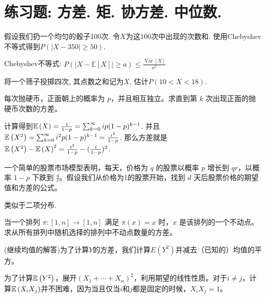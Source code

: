 \section*{练习题: 方差. 矩. 协方差. 中位数.}
\begin{exercise}[投掷筛子]
    假设我们扔一个均匀的骰子100次. 令$X$为这100次中出现的次数和. 使用Chebyshev不等式得到$P(|X-350| \geq 50)$.
\end{exercise}
\begin{solution*}
    Chebyshev不等式: $P(|X-\mathbb{E}[X]| \geq a) \leq \frac{\operatorname{Var}[X]}{a^2}$
\end{solution*}

\begin{exercise}
    将一个筛子投掷四次, 其点数之和记为$X$, 估计$P(10<X<18)$.
\end{exercise}

\begin{exercise}
    每次抛硬币，正面朝上的概率为 \(p\)，并且相互独立。求直到第 \(k\) 次出现正面的抛硬币次数的方差。 
\end{exercise}

\begin{solution*}
    计算得到$\mathbb E\left(X\right)=\frac{i}{1-p}=\sum_{k=0}^{\infty} i p (1 - p)^{k - 1}$. 并且$\mathbb E\left(X^2\right)=\sum_{k=0}^{\infty} i^2 p (1 - p)^{k - 1}=\frac{i^2}{1-p}$. 那么方差就是$\mathbb E\left(X^2\right)-\mathbb E\left(X\right)^2=\frac{i^2}{1-p}-(\frac{i}{1-p})^2$.
\end{solution*}

\begin{exercise}
一个简单的股票市场模型表明，每天，价格为 \( q \) 的股票以概率 \( p \) 增长到 \( qr \)，以概率 \( 1 - p \) 下跌到 \( \frac{q}{r} \)。假设我们从价格为1的股票开始，找到 \( d \) 天后股票价格的期望值和方差的公式。
\end{exercise}

\begin{solution*}
    类似于二项分布. 
\end{solution*}

\begin{exercise}
    当一个排列 \(\pi: [1, n] \rightarrow [1, n]\) 满足 \(\pi (x) = x\) 时，\(x\) 是该排列的一个不动点。求从所有排列中随机选择的排列中不动点数量的方差。
\end{exercise}

\begin{solution*}
    (继续均值的解答)为了计算$Y$的方差，我们计算$E\left(Y^2\right)$并减去（已知的）均值的平方。

为了计算$\mathbb E\left(Y^2\right)$，展开$\left(X_1+\cdots+X_n\right)^2$，利用期望的线性性质。对于$i \neq j$，计算$\mathbb E\left(X_i X_j\right)$并不困难，因为当且仅当$i$和$j$都是固定的时候，$X_i X_j=1$。
\end{solution*}


